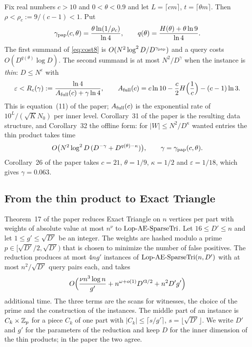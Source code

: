 Fix real numbers \(c>10\) and \(0<\theta<0.9\) and let \(L=\lceil cm\rceil\),
\(t=\lceil\theta m\rceil\).  Then \(\rho<\rho_c:=9/(c-1)<1\).  Put
\begin{equation}\label{eq:gpap-q}
  \gamma_{\mathrm{pap}}(c,\theta)=\frac{\theta\ln(1/\rho_c)}{\ln 4},\qquad
  q(\theta)=\frac{H(\theta)+\theta\ln 9}{\ln 4}.
\end{equation}
The first summand of \eqref{eq:cost8} is \(O(N^{2}\log^{2}D/D^{\gamma_{\mathrm{pap}}})\) and a
query costs \(O(D^{q(\theta)}\log D)\).  The second summand is at most
\(N^{2}/D^{\gamma}\) when the instance is \emph{thin}: \(D\le N^{\varepsilon}\)
with
\begin{equation}\label{eq:Rc}
  \varepsilon<R_{c}(\gamma):=\frac{\ln 4}{A_{\mathrm{full}}(c)+\gamma\ln 4},\qquad
  A_{\mathrm{full}}(c)=c\ln 10-\frac c2H\Bigl(\frac1c\Bigr)-(c-1)\ln 3 .
\end{equation}
This is equation~(11) of the paper; \(A_{\mathrm{full}}(c)\) is the exponential rate of
\(10^{L}/(\sqrt K N_0)\) per inner level.  Corollary~31 of the paper is the
resulting data structure, and Corollary~32 the offline form: for
\(|W|\le N^{2}/D^{\kappa}\) wanted entries the thin product takes time
\begin{equation}\label{eq:cor32}
  O\bigl(N^{2}\log^{2}D\,(D^{-\gamma}+D^{q(\theta)-\kappa})\bigr),
  \qquad\gamma=\gamma_{\mathrm{pap}}(c,\theta).
\end{equation}
Corollary~26 of the paper takes \(c=21\), \(\theta=1/9\), \(\kappa=1/2\) and
\(\varepsilon=1/18\), which gives \(\gamma=0.063\).

\subsection{From the thin product to Exact Triangle}
\label{sec:host}

Theorem~17 of the paper reduces Exact Triangle on \(n\) vertices per part with
weights of absolute value at most \(n^{\nu}\) to \(\textup{Lop-AE-SparseTri}\).  Let
\(16\le D'\le n\) and let \(1\le g'\le\sqrt{D'}\) be an integer.  The weights
are hashed modulo a prime \(p\in[\sqrt{D'}/2,\sqrt{D'})\) that is chosen to
minimize the number of false positives.  The reduction produces at most
\(4ng'\) instances of \(\textup{Lop-AE-SparseTri}(n,D')\) with at most \(n^{2}/\sqrt{D'}\) query
pairs each, and takes
\begin{equation}\label{eq:thm17}
  O\Bigl(\frac{\nu n^{3}\log n}{g'}+n^{\omega+o(1)}D'^{3/2}+n^{2}D'g'\Bigr)
\end{equation}
additional time.  The three terms are the scans for witnesses, the choice of the
prime and the construction of the instances.  The middle part of an instance is
\(C_k\times\mathbb{Z}_p\) for a piece \(C_k\) of one part with
\(|C_k|\le\lceil s/g'\rceil\), \(s=\lfloor\sqrt{D'}\rfloor\).  We write \(D'\)
and \(g'\) for the parameters of the reduction and keep \(D\) for the inner
dimension of the thin products; in the paper the two agree.


